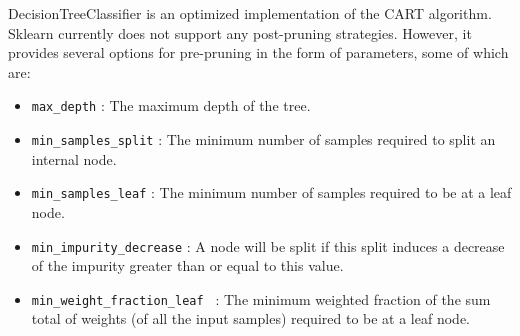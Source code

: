 \documentclass[12pt]{article}
\begin{document}
DecisionTreeClassifier is an optimized implementation of the CART algorithm. Sklearn currently does not support any post-pruning strategies. However, it provides several options for pre-pruning in the form of parameters, some of which are:
\begin{itemize}
\item \texttt{max\_depth} : The maximum depth of the tree.
\item \texttt{min\_samples\_split} : The minimum number of samples required to split an internal node.
\item \texttt{min\_samples\_leaf} : The minimum number of samples required to be at a leaf node.
\item \texttt{min\_impurity\_decrease} : A node will be split if this split induces a decrease of the impurity greater than or equal to this value.
\item \texttt{min\_weight\_fraction\_leaf } : The minimum weighted fraction of the sum total of weights (of all the input samples) required to be at a leaf node.
\end{itemize}
\end{document}
